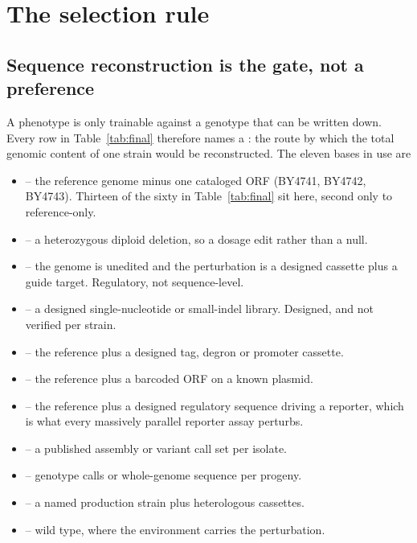 
\section{The selection rule}\label{sec:rule}

\subsection{Sequence reconstruction is the gate, not a preference}

A phenotype is only trainable against a genotype that can be written down. Every row in
Table~\ref{tab:final} therefore names a : the route by which the
total genomic content of one strain would be reconstructed. The eleven bases in use are

\begin{itemize}[leftmargin=1.2em,itemsep=1pt,topsep=2pt]
  \item {} -- the reference genome minus one cataloged ORF (BY4741, BY4742,
    BY4743). Thirteen of the sixty in Table~\ref{tab:final} sit here, second only to reference-only.
  \item {} -- a heterozygous diploid deletion, so a dosage edit rather
    than a null.
  \item {} -- the genome is unedited and the perturbation is a designed
    cassette plus a guide target. Regulatory, not sequence-level.
  \item {} -- a designed single-nucleotide or small-indel library.
    Designed, and not verified per strain.
  \item {} -- the reference plus a designed tag, degron or promoter cassette.
  \item {} -- the reference plus a barcoded ORF on a known plasmid.
  \item {} -- the reference plus a designed regulatory sequence
    driving a reporter, which is what every massively parallel reporter assay perturbs.
  \item {} -- a published assembly or variant call set per isolate.
  \item {} -- genotype calls or whole-genome sequence per progeny.
  \item {} -- a named production strain plus heterologous cassettes.
  \item {} -- wild type, where the environment carries the perturbation.
\end{itemize}

